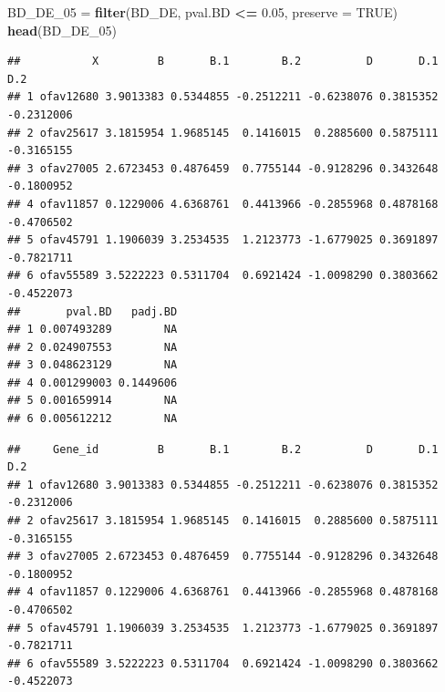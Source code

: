 \documentclass[
]{article}
\newenvironment{Shaded}{\begin{snugshade}}{\end{snugshade}}
\newcommand{\DataTypeTok}[1]{\textcolor[rgb]{0.13,0.29,0.53}{#1}}
\newcommand{\DecValTok}[1]{\textcolor[rgb]{0.00,0.00,0.81}{#1}}
\newcommand{\FloatTok}[1]{\textcolor[rgb]{0.00,0.00,0.81}{#1}}
\newcommand{\KeywordTok}[1]{\textcolor[rgb]{0.13,0.29,0.53}{\textbf{#1}}}
\newcommand{\NormalTok}[1]{#1}
\newcommand{\OperatorTok}[1]{\textcolor[rgb]{0.81,0.36,0.00}{\textbf{#1}}}
\newcommand{\OtherTok}[1]{\textcolor[rgb]{0.56,0.35,0.01}{#1}}
\newcommand{\StringTok}[1]{\textcolor[rgb]{0.31,0.60,0.02}{#1}}
\begin{document}
\begin{Shaded}
\begin{Highlighting}[]
\NormalTok{BD_DE_}\DecValTok{05}\NormalTok{ =}\StringTok{ }\KeywordTok{filter}\NormalTok{(BD_DE, pval.BD }\OperatorTok{<=}\StringTok{ }\FloatTok{0.05}\NormalTok{, }\DataTypeTok{preserve =} \OtherTok{TRUE}\NormalTok{)}
\KeywordTok{head}\NormalTok{(BD_DE_}\DecValTok{05}\NormalTok{) }
\end{Highlighting}
\end{Shaded}

\begin{verbatim}
##           X         B       B.1        B.2          D       D.1        D.2
## 1 ofav12680 3.9013383 0.5344855 -0.2512211 -0.6238076 0.3815352 -0.2312006
## 2 ofav25617 3.1815954 1.9685145  0.1416015  0.2885600 0.5875111 -0.3165155
## 3 ofav27005 2.6723453 0.4876459  0.7755144 -0.9128296 0.3432648 -0.1800952
## 4 ofav11857 0.1229006 4.6368761  0.4413966 -0.2855968 0.4878168 -0.4706502
## 5 ofav45791 1.1906039 3.2534535  1.2123773 -1.6779025 0.3691897 -0.7821711
## 6 ofav55589 3.5222223 0.5311704  0.6921424 -1.0098290 0.3803662 -0.4522073
##       pval.BD   padj.BD
## 1 0.007493289        NA
## 2 0.024907553        NA
## 3 0.048623129        NA
## 4 0.001299003 0.1449606
## 5 0.001659914        NA
## 6 0.005612212        NA
\end{verbatim}

\begin{Shaded}
\end{Shaded}

\begin{verbatim}
##     Gene_id         B       B.1        B.2          D       D.1        D.2
## 1 ofav12680 3.9013383 0.5344855 -0.2512211 -0.6238076 0.3815352 -0.2312006
## 2 ofav25617 3.1815954 1.9685145  0.1416015  0.2885600 0.5875111 -0.3165155
## 3 ofav27005 2.6723453 0.4876459  0.7755144 -0.9128296 0.3432648 -0.1800952
## 4 ofav11857 0.1229006 4.6368761  0.4413966 -0.2855968 0.4878168 -0.4706502
## 5 ofav45791 1.1906039 3.2534535  1.2123773 -1.6779025 0.3691897 -0.7821711
## 6 ofav55589 3.5222223 0.5311704  0.6921424 -1.0098290 0.3803662 -0.4522073
\end{verbatim}
\end{document}
